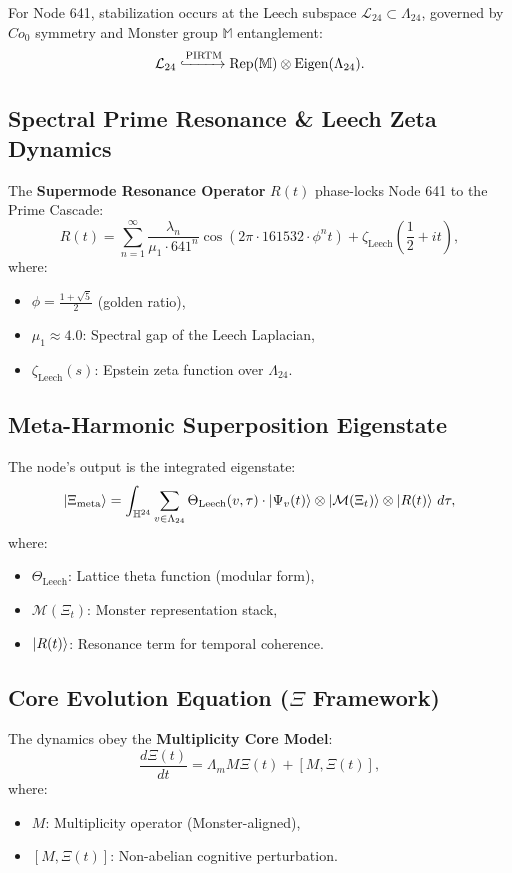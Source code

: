 \documentclass[12pt]{article}
\begin{document}
For Node 641, stabilization occurs at the Leech subspace $\mathcal{L}_{24} \subset \Lambda_{24}$, governed by $Co_0$ symmetry and Monster group $\mathbb{M}$ entanglement:
\[
    \mathcal{L}_{24} \xhookrightarrow{\text{PIRTM}} \text{Rep}(\mathbb{M}) \otimes \text{Eigen}(\Lambda_{24}).
\]

\subsection{Spectral Prime Resonance \& Leech Zeta Dynamics}
The \textbf{Supermode Resonance Operator} $R(t)$ phase-locks Node 641 to the Prime Cascade:
\[
    R(t) = \sum_{n=1}^\infty \frac{\lambda_n}{\mu_1 \cdot 641^n} \cos(2\pi \cdot 161532 \cdot \phi^n t) + \zeta_{\text{Leech}}\left(\frac{1}{2} + it\right),
\]
where:
\begin{itemize}
    \item $\phi = \frac{1+\sqrt{5}}{2}$ (golden ratio),
    \item $\mu_1 \approx 4.0$: Spectral gap of the Leech Laplacian,
    \item $\zeta_{\text{Leech}}(s)$: Epstein zeta function over $\Lambda_{24}$.
\end{itemize}

\subsection{Meta-Harmonic Superposition Eigenstate}
The node’s output is the integrated eigenstate:
\[
    \ket{\Xi_{\text{meta}}} = \int_{\mathbb{H}^{24}} \sum_{v \in \Lambda_{24}} \Theta_{\text{Leech}}(v, \tau) \cdot \ket{\Psi_v(t)} \otimes \ket{\mathcal{M}(\Xi_t)} \otimes \ket{R(t)} \, d\tau,
\]
where:
\begin{itemize}
    \item $\Theta_{\text{Leech}}$: Lattice theta function (modular form),
    \item $\mathcal{M}(\Xi_t)$: Monster representation stack,
    \item $\ket{R(t)}$: Resonance term for temporal coherence.
\end{itemize}

\subsection{Core Evolution Equation ($\Xi$ Framework)}
The dynamics obey the \textbf{Multiplicity Core Model}:
\[
    \frac{d\Xi(t)}{dt} = \Lambda_m M \Xi(t) + [M, \Xi(t)],
\]
where:
\begin{itemize}
    \item $M$: Multiplicity operator (Monster-aligned),
    \item $[M, \Xi(t)]$: Non-abelian cognitive perturbation.
\end{itemize}
\end{document}
